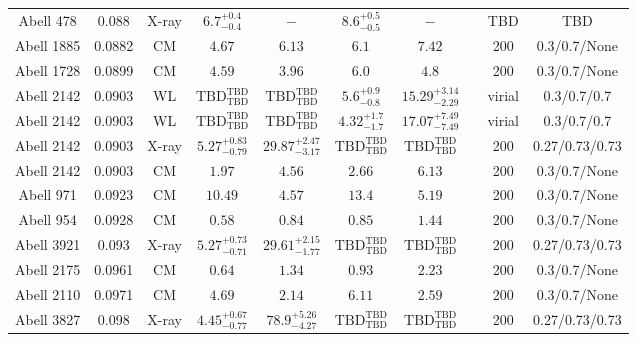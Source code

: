 \begin{table}
\begin{tabular}{cccccccccc}
Abell 478 & 0.088 & X-ray & ${6.7}^{+0.4}_{-0.4}$ & ${-}^{}_{}$ & ${8.6}^{+0.5}_{-0.5}$ & ${-}^{}_{}$ & \citet{XU01.1} & TBD & TBD \\
Abell 1885 & 0.0882 & CM & ${4.67}^{}_{}$ & ${6.13}^{}_{}$ & ${6.1}^{}_{}$ & ${7.42}^{}_{}$ & \citet{RI06.1} & 200 & 0.3/0.7/None \\
Abell 1728 & 0.0899 & CM & ${4.59}^{}_{}$ & ${3.96}^{}_{}$ & ${6.0}^{}_{}$ & ${4.8}^{}_{}$ & \citet{RI06.1} & 200 & 0.3/0.7/None \\
Abell 2142 & 0.0903 & WL & ${\mathrm{TBD}}^{\mathrm{TBD}}_{\mathrm{TBD}}$ & ${\mathrm{TBD}}^{\mathrm{TBD}}_{\mathrm{TBD}}$ & ${5.6}^{+0.9}_{-0.8}$ & ${15.29}^{+3.14}_{-2.29}$ & \citet{UM09.1} & virial & 0.3/0.7/0.7 \\
Abell 2142 & 0.0903 & WL & ${\mathrm{TBD}}^{\mathrm{TBD}}_{\mathrm{TBD}}$ & ${\mathrm{TBD}}^{\mathrm{TBD}}_{\mathrm{TBD}}$ & ${4.32}^{+1.7}_{-1.7}$ & ${17.07}^{+7.49}_{-7.49}$ & \citet{OK08.1} & virial & 0.3/0.7/0.7 \\
Abell 2142 & 0.0903 & X-ray & ${5.27}^{+0.83}_{-0.79}$ & ${29.87}^{+2.47}_{-3.17}$ & ${\mathrm{TBD}}^{\mathrm{TBD}}_{\mathrm{TBD}}$ & ${\mathrm{TBD}}^{\mathrm{TBD}}_{\mathrm{TBD}}$ & \citet{BA14.1} & 200 & 0.27/0.73/0.73 \\
Abell 2142 & 0.0903 & CM & ${1.97}^{}_{}$ & ${4.56}^{}_{}$ & ${2.66}^{}_{}$ & ${6.13}^{}_{}$ & \citet{RI06.1} & 200 & 0.3/0.7/None \\
Abell 971 & 0.0923 & CM & ${10.49}^{}_{}$ & ${4.57}^{}_{}$ & ${13.4}^{}_{}$ & ${5.19}^{}_{}$ & \citet{RI06.1} & 200 & 0.3/0.7/None \\
Abell 954 & 0.0928 & CM & ${0.58}^{}_{}$ & ${0.84}^{}_{}$ & ${0.85}^{}_{}$ & ${1.44}^{}_{}$ & \citet{RI06.1} & 200 & 0.3/0.7/None \\
Abell 3921 & 0.093 & X-ray & ${5.27}^{+0.73}_{-0.71}$ & ${29.61}^{+2.15}_{-1.77}$ & ${\mathrm{TBD}}^{\mathrm{TBD}}_{\mathrm{TBD}}$ & ${\mathrm{TBD}}^{\mathrm{TBD}}_{\mathrm{TBD}}$ & \citet{BA14.1} & 200 & 0.27/0.73/0.73 \\
Abell 2175 & 0.0961 & CM & ${0.64}^{}_{}$ & ${1.34}^{}_{}$ & ${0.93}^{}_{}$ & ${2.23}^{}_{}$ & \citet{RI06.1} & 200 & 0.3/0.7/None \\
Abell 2110 & 0.0971 & CM & ${4.69}^{}_{}$ & ${2.14}^{}_{}$ & ${6.11}^{}_{}$ & ${2.59}^{}_{}$ & \citet{RI06.1} & 200 & 0.3/0.7/None \\
Abell 3827 & 0.098 & X-ray & ${4.45}^{+0.67}_{-0.77}$ & ${78.9}^{+5.26}_{-4.27}$ & ${\mathrm{TBD}}^{\mathrm{TBD}}_{\mathrm{TBD}}$ & ${\mathrm{TBD}}^{\mathrm{TBD}}_{\mathrm{TBD}}$ & \citet{BA14.1} & 200 & 0.27/0.73/0.73 \\

\end{tabular}
\end{table}
